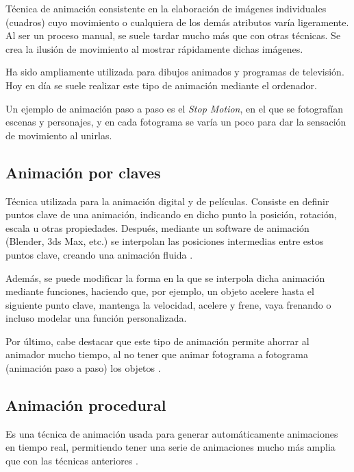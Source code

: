 \documentclass{article}
\begin{document}
Técnica de animación consistente en la elaboración de imágenes individuales (cuadros) cuyo movimiento o cualquiera de los demás atributos varía ligeramente. Al ser un proceso manual, se suele tardar mucho más que con otras técnicas. Se crea la ilusión de movimiento al mostrar rápidamente dichas imágenes. 

\bigskip

Ha sido ampliamente utilizada para dibujos animados y programas de televisión. Hoy en día se suele realizar este tipo de animación mediante el ordenador. 

\bigskip

Un ejemplo de animación paso a paso es el \textit{Stop Motion}, en el que se fotografían escenas y personajes, y en cada fotograma se varía un poco para dar la sensación de movimiento al unirlas.


\subsection{Animación por claves}

Técnica utilizada para la animación digital y de películas. Consiste en definir puntos clave de una animación, indicando en dicho punto la posición, rotación, escala u otras propiedades. Después, mediante un software de animación (Blender, 3ds Max, etc.) se interpolan las posiciones intermedias entre estos puntos clave, creando una animación fluida \cite{keyframe}.

\bigskip

Además, se puede modificar la forma en la que se interpola dicha animación mediante funciones, haciendo que, por ejemplo, un objeto acelere hasta el siguiente punto clave, mantenga la velocidad, acelere y frene, vaya frenando o incluso modelar una función personalizada.

\bigskip

Por último, cabe destacar que este tipo de animación permite ahorrar al animador mucho tiempo, al no tener que animar fotograma a fotograma (animación paso a paso) los objetos \cite{keyframe}.


\subsection{Animación procedural}

Es una técnica de animación usada para generar automáticamente animaciones en tiempo real, permitiendo tener una serie de animaciones mucho más amplia que con las técnicas anteriores \cite{proc}.
\end{document}
